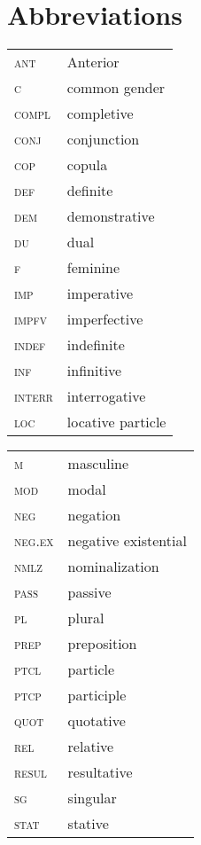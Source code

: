 \documentclass[output=paper]{langsci/langscibook}
\newcommand{\ꜥ}{ʿ}
\newcommand{\ꜣ}{\kern-.25pt\texttt{ꜣ}\kern-.6pt}
\begin{document}
\section*{Abbreviations}
\begin{tabularx}{.45\textwidth}{lQ}
\textsc{ant} & Anterior\\
\textsc{c} & common gender\\
\textsc{compl} & completive\\
\textsc{conj} & conjunction\\
\textsc{cop} & copula\\
\textsc{def}	 & definite\\
\textsc{dem} & demonstrative\\
\textsc{du} & dual\\
\textsc{f} & feminine\\
\textsc{imp} & imperative\\
\textsc{impfv} & imperfective\\
\textsc{indef} & indefinite\\
\textsc{inf} & infinitive\\
\textsc{interr} & interrogative\\
\textsc{loc} & locative particle\\
\end{tabularx}
\begin{tabularx}{.45\textwidth}{lQ}
\textsc{m} & masculine\\
\textsc{mod} & modal\\	
\textsc{neg} & negation\\
\textsc{neg.ex} & negative existential\\ 
\textsc{nmlz} &	nominalization\\	
\textsc{pass	} & passive\\
\textsc{pl} & plural\\	
\textsc{prep	} & preposition\\
\textsc{ptcl	} & particle\\
\textsc{ptcp} & participle\\
\textsc{quot} & 	quotative\\
\textsc{rel} & relative\\
\textsc{resul} & resultative\\
\textsc{sg} & singular\\
\textsc{stat} & stative\\
\end{tabularx}
\end{document}
